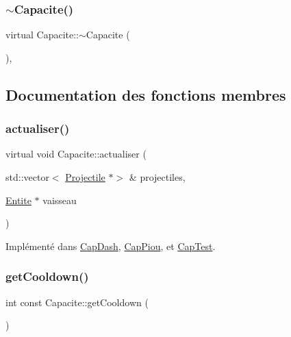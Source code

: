 \subsubsection{\texorpdfstring{$\sim$\+Capacite()}{~Capacite()}}
{\footnotesize\ttfamily virtual Capacite\+::$\sim$\+Capacite (\begin{DoxyParamCaption}{ }\end{DoxyParamCaption})\hspace{0.3cm}{\ttfamily [virtual]}, {\ttfamily [default]}}



\subsection{Documentation des fonctions membres}
\mbox{\label{class_capacite_a7d4e86c20cd198960f25c0eb443148fe}} 
\subsubsection{\texorpdfstring{actualiser()}{actualiser()}}
{\footnotesize\ttfamily virtual void Capacite\+::actualiser (\begin{DoxyParamCaption}\item[{std\+::vector$<$ \hyperlink{class_projectile}{Projectile} $\ast$$>$ \&}]{projectiles,  }\item[{\hyperlink{class_entite}{Entite} $\ast$}]{vaisseau }\end{DoxyParamCaption})\hspace{0.3cm}{\ttfamily [pure virtual]}}



Implémenté dans \hyperlink{class_cap_dash_a886522c648db49b81c330737ad96a517}{Cap\+Dash}, \hyperlink{class_cap_piou_aabdcaa253f10db2bca12e750005485fc}{Cap\+Piou}, et \hyperlink{class_cap_test_a5742770894ff765e2785f82aab88b223}{Cap\+Test}.

\mbox{\label{class_capacite_a1842888fc39a0054d3cc9d7236ab1191}} 
\subsubsection{\texorpdfstring{get\+Cooldown()}{getCooldown()}}
{\footnotesize\ttfamily int const Capacite\+::get\+Cooldown (\begin{DoxyParamCaption}{ }\end{DoxyParamCaption})\hspace{0.3cm}{\ttfamily [inline]}}

